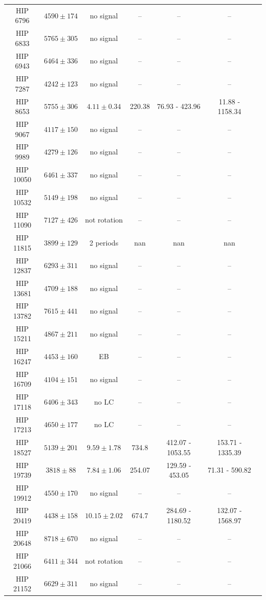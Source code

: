 \begin{longtable}{|c|c|c|c|c|c|c|}
HIP 6796 & $ 4590 \pm 174 $ & no signal &-- &-- &-- \\
HIP 6833 & $ 5765 \pm 305 $ & no signal &-- &-- &-- \\
HIP 6943 & $ 6464 \pm 336 $ & no signal &-- &-- &-- \\
HIP 7287 & $ 4242 \pm 123 $ & no signal &-- &-- &-- \\
HIP 8653 & $ 5755 \pm 306 $ &$ 4.11 \pm 0.34 $ & 220.38 & 76.93 - 423.96 & 11.88 - 1158.34 \\
HIP 9067 & $ 4117 \pm 150 $ & no signal &-- &-- &-- \\
HIP 9989 & $ 4279 \pm 126 $ & no signal &-- &-- &-- \\
HIP 10050 & $ 6461 \pm 337 $ & no signal &-- &-- &-- \\
HIP 10532 & $ 5149 \pm 198 $ & no signal &-- &-- &-- \\
HIP 11090 & $ 7127 \pm 426 $ & not rotation &-- &-- &-- \\
HIP 11815 & $ 3899 \pm 129 $ &2 periods & nan & nan & nan \\
HIP 12837 & $ 6293 \pm 311 $ & no signal &-- &-- &-- \\
HIP 13681 & $ 4709 \pm 188 $ & no signal &-- &-- &-- \\
HIP 13782 & $ 7615 \pm 441 $ & no signal &-- &-- &-- \\
HIP 15211 & $ 4867 \pm 211 $ & no signal &-- &-- &-- \\
HIP 16247 & $ 4453 \pm 160 $ &EB &-- &-- &-- \\
HIP 16709 & $ 4104 \pm 151 $ & no signal &-- &-- &-- \\
HIP 17118 & $ 6406 \pm 343 $ & no LC &-- &-- &-- \\
HIP 17213 & $ 4650 \pm 177 $ & no LC &-- &-- &-- \\
HIP 18527 & $ 5139 \pm 201 $ &$ 9.59 \pm 1.78 $ & 734.8 & 412.07 - 1053.55 & 153.71 - 1335.39 \\
HIP 19739 & $ 3818 \pm 88 $ &$ 7.84 \pm 1.06 $ & 254.07 & 129.59 - 453.05 & 71.31 - 590.82 \\
HIP 19912 & $ 4550 \pm 170 $ & no signal &-- &-- &-- \\
HIP 20419 & $ 4438 \pm 158 $ &$ 10.15 \pm 2.02 $ & 674.7 & 284.69 - 1180.52 & 132.07 - 1568.97 \\
HIP 20648 & $ 8718 \pm 670 $ & no signal &-- &-- &-- \\
HIP 21066 & $ 6411 \pm 344 $ & not rotation &-- &-- &-- \\
HIP 21152 & $ 6629 \pm 311 $ & no signal &-- &-- &-- \\

\end{longtable}
